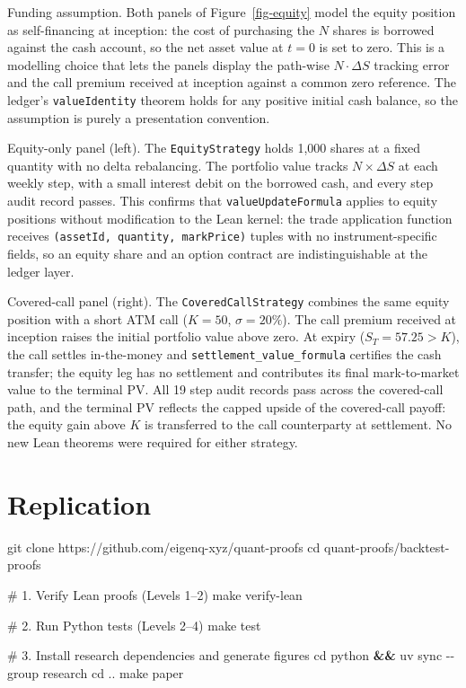 \documentclass[
  11pt,
  letterpaper,
  DIV=12,
  numbers=noendperiod]{scrartcl}
\newenvironment{Shaded}{\begin{snugshade}}{\end{snugshade}}
\newcommand{\AttributeTok}[1]{\textcolor[rgb]{0.40,0.45,0.13}{#1}}
\newcommand{\BuiltInTok}[1]{\textcolor[rgb]{0.00,0.23,0.31}{#1}}
\newcommand{\CommentTok}[1]{\textcolor[rgb]{0.37,0.37,0.37}{#1}}
\newcommand{\ExtensionTok}[1]{\textcolor[rgb]{0.00,0.23,0.31}{#1}}
\newcommand{\FunctionTok}[1]{\textcolor[rgb]{0.28,0.35,0.67}{#1}}
\newcommand{\KeywordTok}[1]{\textcolor[rgb]{0.00,0.23,0.31}{\textbf{#1}}}
\newcommand{\NormalTok}[1]{\textcolor[rgb]{0.00,0.23,0.31}{#1}}
\numberwithin{equation}{section}
\numberwithin{figure}{section}
\numberwithin{table}{section}
\let\quantproofsoldsection\section
\renewcommand{\section}{\clearpage\quantproofsoldsection}
\begin{document}
Funding assumption. Both panels of Figure~\ref{fig-equity} model the
equity position as self-financing at inception: the cost of purchasing
the \(N\) shares is borrowed against the cash account, so the net asset
value at \(t=0\) is set to zero. This is a modelling choice that lets
the panels display the path-wise \(N \cdot \Delta S\) tracking error and
the call premium received at inception against a common zero reference.
The ledger's \texttt{valueIdentity} theorem holds for any positive
initial cash balance, so the assumption is purely a presentation
convention.

Equity-only panel (left). The \texttt{EquityStrategy} holds 1,000 shares
at a fixed quantity with no delta rebalancing. The portfolio value
tracks \(N \times \Delta S\) at each weekly step, with a small interest
debit on the borrowed cash, and every step audit record passes. This
confirms that \texttt{valueUpdateFormula} applies to equity positions
without modification to the Lean kernel: the trade application function
receives \texttt{(assetId,\ quantity,\ markPrice)} tuples with no
instrument-specific fields, so an equity share and an option contract
are indistinguishable at the ledger layer.

Covered-call panel (right). The \texttt{CoveredCallStrategy} combines
the same equity position with a short ATM call (\(K = 50\),
\(\sigma = 20\%\)). The call premium received at inception raises the
initial portfolio value above zero. At expiry (\(S_T = 57.25 > K\)), the
call settles in-the-money and \texttt{settlement\_value\_formula}
certifies the cash transfer; the equity leg has no settlement and
contributes its final mark-to-market value to the terminal PV. All 19
step audit records pass across the covered-call path, and the terminal
PV reflects the capped upside of the covered-call payoff: the equity
gain above \(K\) is transferred to the call counterparty at settlement.
No new Lean theorems were required for either strategy.

\section{Replication}\label{sec-replication}

\begin{Shaded}
\begin{Highlighting}[]
\FunctionTok{git}\NormalTok{ clone https://github.com/eigenq{-}xyz/quant{-}proofs}
\BuiltInTok{cd}\NormalTok{ quant{-}proofs/backtest{-}proofs}

\CommentTok{\# 1. Verify Lean proofs (Levels 1–2)}
\FunctionTok{make}\NormalTok{ verify{-}lean}

\CommentTok{\# 2. Run Python tests (Levels 2–4)}
\FunctionTok{make}\NormalTok{ test}

\CommentTok{\# 3. Install research dependencies and generate figures}
\BuiltInTok{cd}\NormalTok{ python }\KeywordTok{\&\&} \ExtensionTok{uv}\NormalTok{ sync }\AttributeTok{{-}{-}group}\NormalTok{ research}
\BuiltInTok{cd}\NormalTok{ ..}
\FunctionTok{make}\NormalTok{ paper}
\end{Highlighting}
\end{Shaded}
\end{document}
